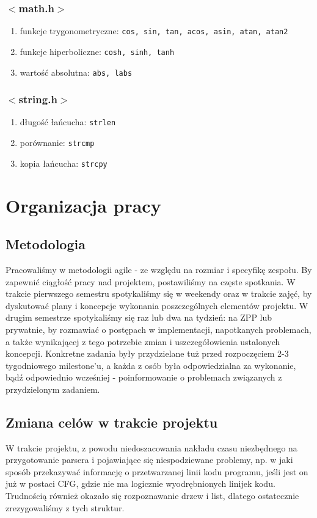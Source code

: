 \documentclass[a4paper,twoside,openright,11pt]{report}
\begin{document}
  \subsection {$<$math.h$>$}
    \begin{enumerate}
      \item funkcje trygonometryczne: \texttt{cos, sin, tan, acos, asin, atan, atan2}
      \item funkcje hiperboliczne: \texttt{cosh, sinh, tanh}
      \item wartość absolutna: \texttt{abs, labs}
    \end{enumerate}
  \subsection {$<$string.h$>$}
    \begin{enumerate}
      \item długość łańcucha: \texttt{strlen}
      \item porównanie: \texttt{strcmp}
      \item kopia łańcucha: \texttt{strcpy}
    \end{enumerate}

  \chapter {Organizacja pracy}

  \section {Metodologia}
\par Pracowaliśmy w metodologii agile - ze względu na rozmiar i specyfikę zespołu. By zapewnić ciągłość pracy nad projektem, postawiliśmy na częste spotkania. W trakcie pierwszego semestru spotykaliśmy się w weekendy oraz w trakcie zajęć, by dyskutować plany i koncepcje wykonania poszczególnych elementów projektu. W drugim semestrze spotykaliśmy się raz lub dwa na tydzień: na ZPP lub prywatnie, by rozmawiać o postępach w implementacji, napotkanych problemach, a także wynikającej z tego potrzebie zmian i uszczegółowienia ustalonych koncepcji. Konkretne zadania były przydzielane tuż przed rozpoczęciem 2-3 tygodniowego milestone’u, a każda z osób była odpowiedzialna za wykonanie, bądź odpowiednio wcześniej - poinformowanie o problemach związanych z przydzielonym zadaniem.

  \section {Zmiana celów w trakcie projektu}
\par W trakcie projektu, z powodu niedoszacowania nakładu czasu niezbędnego na przygotowanie parsera i pojawiające się niespodziewane problemy, np. w jaki sposób przekazywać informację o przetwarzanej linii kodu programu, jeśli jest on już w postaci CFG, gdzie nie ma logicznie wyodrębnionych linijek kodu. Trudnością również okazało się rozpoznawanie drzew i list, dlatego ostatecznie zrezygowaliśmy z tych struktur.
\end{document}
